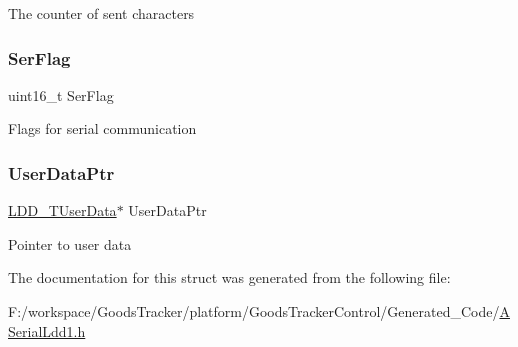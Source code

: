 The counter of sent characters \mbox{\label{struct_a_serial_ldd1___t_device_data_afd48e3955f613be6122b2c347bdeb3b5}} 
\subsubsection{\texorpdfstring{Ser\+Flag}{SerFlag}}
{\footnotesize\ttfamily uint16\+\_\+t Ser\+Flag}

Flags for serial communication \mbox{\label{struct_a_serial_ldd1___t_device_data_a8e77b9d030b00c231823350a904e0f83}} 
\subsubsection{\texorpdfstring{User\+Data\+Ptr}{UserDataPtr}}
{\footnotesize\ttfamily \hyperlink{group___p_e___types__module_ga0b66a73f87238a782318aa0be7578e35}{L\+D\+D\+\_\+\+T\+User\+Data}$\ast$ User\+Data\+Ptr}

Pointer to user data 

The documentation for this struct was generated from the following file\+:\begin{DoxyCompactItemize}
\item 
F\+:/workspace/\+Goods\+Tracker/platform/\+Goods\+Tracker\+Control/\+Generated\+\_\+\+Code/\hyperlink{_a_serial_ldd1_8h}{A\+Serial\+Ldd1.\+h}\end{DoxyCompactItemize}
